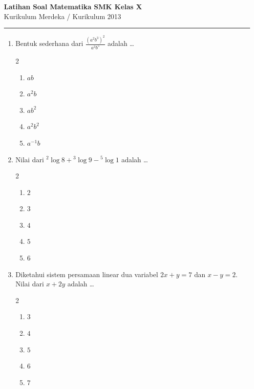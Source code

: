 \documentclass[12pt,a4paper]{article}
\begin{document}
\begin{center}
    \Large \textbf{\textsf{Latihan Soal Matematika SMK Kelas X}}\\
    \normalsize \textsf{Kurikulum Merdeka / Kurikulum 2013}
    \vspace{0.2cm}\\
    \rule{0.8\textwidth}{0.8pt}
\end{center}
\vspace{0.5cm}

\begin{enumerate}[itemsep=2ex]
    \item Bentuk sederhana dari $\displaystyle \frac{(a^2 b^3)^2}{a^3 b^5}$ adalah \dots
    \begin{multicols}{2}
    \begin{enumerate}[label=\Alph*.]
        \item $a b$
        \item $a^2 b$
        \item $a b^2$
        \item $a^2 b^2$
        \item $a^{-1} b$
    \end{enumerate}
    \end{multicols}

    \item Nilai dari ${}^2\log 8 + {}^3\log 9 - {}^5\log 1$ adalah \dots
    \begin{multicols}{2}
    \begin{enumerate}[label=\Alph*.]
        \item $2$
        \item $3$
        \item $4$
        \item $5$
        \item $6$
    \end{enumerate}
    \end{multicols}

    \item Diketahui sistem persamaan linear dua variabel $2x + y = 7$ dan $x - y = 2$. Nilai dari $x + 2y$ adalah \dots
    \begin{multicols}{2}
    \begin{enumerate}[label=\Alph*.]
        \item $3$
        \item $4$
        \item $5$
        \item $6$
        \item $7$
    \end{enumerate}
    \end{multicols}


\end{enumerate}
\end{document}
